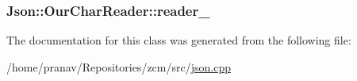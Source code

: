 \subsubsection[{\texorpdfstring{reader\+\_\+}{reader_}}]{ Json\+::\+Our\+Char\+Reader\+::reader\+\_\+\hspace{0.3cm}{\ttfamily [private]}}\hypertarget{classJson_1_1OurCharReader_aedd4520b8570654ed7aa0726075ee58d}{}\label{classJson_1_1OurCharReader_aedd4520b8570654ed7aa0726075ee58d}


The documentation for this class was generated from the following file\+:\begin{DoxyCompactItemize}
\item 
/home/pranav/\+Repositories/zcm/src/\hyperlink{json_8cpp}{json.\+cpp}\end{DoxyCompactItemize}
